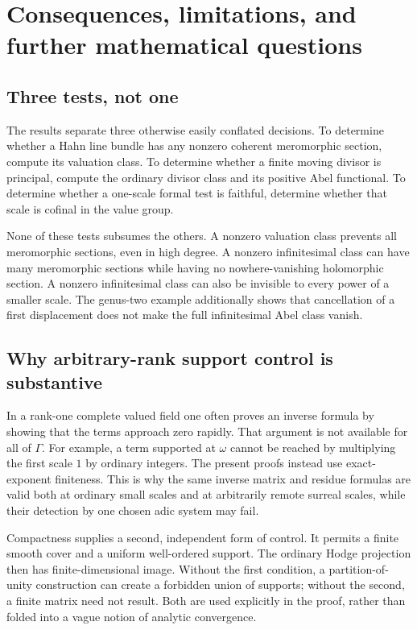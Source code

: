 \documentclass[11pt,letterpaper]{article}
\numberwithin{equation}{section}
\theoremstyle{definition}
\theoremstyle{remark}
\begin{document}
\section{Consequences, limitations, and further mathematical questions}
\label{sec:conclusions}

\subsection{Three tests, not one}
The results separate three otherwise easily conflated decisions.
To determine whether a Hahn line bundle has any nonzero coherent
meromorphic section, compute its valuation class. To determine whether
a finite moving divisor is principal, compute the ordinary divisor
class and its positive Abel functional. To determine whether a
one-scale formal test is faithful, determine whether that scale is
cofinal in the value group.

None of these tests subsumes the others. A nonzero valuation class
prevents all meromorphic sections, even in high degree. A nonzero
infinitesimal class can have many meromorphic sections while having no
nowhere-vanishing holomorphic section. A nonzero infinitesimal class
can also be invisible to every power of a smaller scale. The genus-two
example additionally shows that cancellation of a first displacement
does not make the full infinitesimal Abel class vanish.

\subsection{Why arbitrary-rank support control is substantive}
In a rank-one complete valued field one often proves an inverse formula
by showing that the terms approach zero rapidly. That argument is not
available for all of $\Gamma$. For example, a term supported at
$\omega$ cannot be reached by multiplying the first scale $1$ by
ordinary integers. The present proofs instead use exact-exponent
finiteness. This is why the same inverse matrix and residue formulas
are valid both at ordinary small scales and at arbitrarily remote
surreal scales, while their detection by one chosen adic system may
fail.

Compactness supplies a second, independent form of control. It permits
a finite smooth cover and a uniform well-ordered support. The ordinary
Hodge projection then has finite-dimensional image. Without the first
condition, a partition-of-unity construction can create a forbidden
union of supports; without the second, a finite matrix need not result.
Both are used explicitly in the proof, rather than folded into a vague
notion of analytic convergence.
\end{document}

